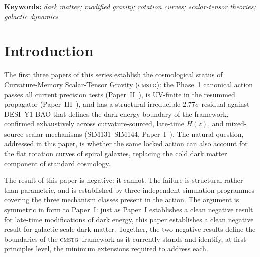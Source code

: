\documentclass[12pt,a4paper]{article}
\newcommand{\CMSTG}{\textsc{cmstg}}
\newcommand{\keywords}[1]{\par\noindent\textbf{Keywords:} \textit{#1}\par\bigskip}
\theoremstyle{plain}
\begin{document}
\begin{abstract}
Phase~5 simulations (SIM151--SIM153) complete the programme by testing the three
candidate extension options identified above. The chameleon coupling option
(Option~B) fails by structural shape inversion: flat curves require the enhancement
factor $E(r) = V_{\rm obs}^2/V_{\rm bary}^2$ to increase with radius, while any
monotone density-dependent coupling $\beta(\rho_b)$ produces $E(r)$ decreasing with
radius, with Pearson anti-correlation $r = -0.81$ (SIM152). The sextic-stabilized
condensate (Option~C) faces a $466\times$ mass gap between the galactic-fit
condensate mass and the cosmological dark matter density requirement, with all
gap-closing routes blocked by rotation-curve shape incompatibility and coupling-sign
constraints (SIM153). No mechanism within the three available channels of action
extension---mass modification, coupling modification, or potential modification---can
produce galactic dark matter within the locked \CMSTG\ action.
\end{abstract}

\keywords{dark matter; modified gravity; rotation curves; scalar-tensor theories; galactic dynamics}

\tableofcontents
\bigskip

\section{Introduction}
\label{sec:intro}

The first three papers of this series establish the cosmological status of
Curvature-Memory Scalar-Tensor Gravity (\CMSTG): the Phase~1 canonical action
passes all current precision tests (Paper~II~\cite{WilsonPaperII}), is UV-finite
in the resummed propagator (Paper~III~\cite{WilsonPaperIII}), and has a
structural irreducible $2.77\sigma$ residual against DESI~Y1 BAO that defines
the dark-energy boundary of the framework, confirmed exhaustively across
curvature-sourced, late-time $H(z)$, and mixed-source scalar mechanisms
(SIM131--SIM144, Paper~I~\cite{WilsonPaperI}). The
natural question, addressed in this paper, is whether the same locked action
can also account for the flat rotation curves of spiral galaxies, replacing the
cold dark matter component of standard cosmology.

The result of this paper is negative: it cannot. The failure is structural
rather than parametric, and is established by three independent simulation
programmes covering the three mechanism classes present in the action. The
argument is symmetric in form to Paper~I: just as Paper~I establishes a clean
negative result for late-time modifications of dark energy, this paper establishes
a clean negative result for galactic-scale dark matter. Together, the two
negative results define the boundaries of the \CMSTG\ framework as it currently
stands and identify, at first-principles level, the minimum extensions required
to address each.
\end{document}
